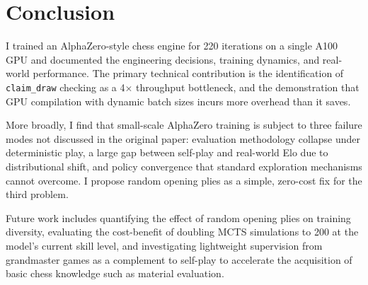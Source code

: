 \documentclass[conference]{IEEEtran}
\begin{document}
\section{Conclusion}

I trained an AlphaZero-style chess engine for 220 iterations on a single
A100 GPU and documented the engineering decisions, training dynamics, and
real-world performance. The primary technical contribution is the identification
of \texttt{claim\_draw} checking as a 4$\times$ throughput bottleneck, and the
demonstration that GPU compilation with dynamic batch sizes incurs more overhead
than it saves.

More broadly, I find that small-scale AlphaZero training is subject to three
failure modes not discussed in the original paper: evaluation methodology
collapse under deterministic play, a large gap between self-play and real-world
Elo due to distributional shift, and policy convergence that standard
exploration mechanisms cannot overcome. I propose random opening plies as a
simple, zero-cost fix for the third problem.

Future work includes quantifying the effect of random opening plies on
training diversity, evaluating the cost-benefit of doubling MCTS simulations
to 200 at the model's current skill level, and investigating lightweight
supervision from grandmaster games as a complement to self-play to accelerate
the acquisition of basic chess knowledge such as material evaluation.



\end{document}
